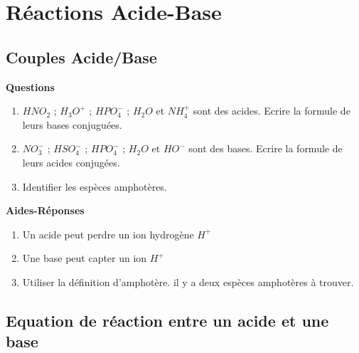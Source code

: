 \documentclass[
]{book}
\providecommand{\tightlist}{%
  \setlength{\itemsep}{0pt}\setlength{\parskip}{0pt}}
\def\tightlist{}
\begin{document}
\hypertarget{ruxe9actions-acide-base}{%
\chapter{Réactions Acide-Base}\label{ruxe9actions-acide-base}}

\hypertarget{couples-acidebase}{%
\section{Couples Acide/Base}\label{couples-acidebase}}

\begin{blackbox}

\begin{center}
\textbf{Questions}

\end{center}

\begin{enumerate}
\def\labelenumi{\arabic{enumi}.}
\tightlist
\item
  \(HNO_2\) ; \(H_3O^+\) ; \(HPO_4^{-}\) ; \(H_2O\) et \(NH_4^+\) sont des acides. Ecrire la formule de leurs bases conjuguées.
\item
  \(NO_3^-\) ; \(HSO_4^-\) ; \(HPO_4^{-}\) ; \(H_2O\) et \(HO^-\) sont des bases. Ecrire la formule de leurs acides conjugées.
\item
  Identifier les espèces amphotères.
\end{enumerate}

\end{blackbox}

\textbf{Aides-Réponses}

\begin{enumerate}
\def\labelenumi{\arabic{enumi}.}
\tightlist
\item
  Un acide peut perdre un ion hydrogène \(H^+\)
\item
  Une base peut capter un ion \(H^+\)
\item
  Utiliser la définition d'amphotère. il y a deux espèces amphotères à trouver.
\end{enumerate}

\hypertarget{equation-de-ruxe9action-entre-un-acide-et-une-base}{%
\section{Equation de réaction entre un acide et une base}\label{equation-de-ruxe9action-entre-un-acide-et-une-base}}
\end{document}
